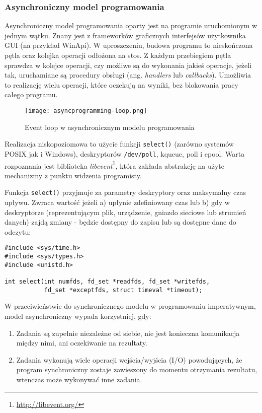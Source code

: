 \subsubsection{Asynchroniczny model programowania}
\label{subsub:asyncprogramming}

Asynchroniczny model programowania oparty jest na programie uruchomionym w jednym wątku. Znany jest z frameworków graficznych interfejsów użytkownika GUI (na przykład WinApi). W uproszczeniu, budowa programu to nieskończona pętla oraz kolejka operacji odłożona na stos. Z każdym przebiegiem pętla sprawdza w kolejce operacji, czy możliwe są do wykonania jakieś operacje, jeżeli tak, uruchamiane są procedury obsługi (ang. \emph{handlers} lub \emph{callbacks}). Umożliwia to realizację wielu operacji, które oczekują na wyniki, bez blokowania pracy całego programu.

\begin{figure}[H]
  \centering
    \texttt{[image: asyncprogramming-loop.png]}
  \caption[Event loop w asynchronicznym modelu programowania]{Event loop w asynchronicznym modelu programowania}
\end{figure}

Realizacja niskopoziomowa to użycie funkcji \lstinline{select()} (zarówno systemów POSIX jak i Windows), deskryptorów \lstinline{/dev/poll}, kqueue, poll i epool. Warta rozpoznania jest biblioteka \emph{libevent}\footnote{\url{http://libevent.org/}}, która zakłada abstrakcję na użyte mechanizmy z punktu widzenia programisty\cite{programming-async-sockets}.

Funkcja \lstinline{select()} przyjmuje za parametry deskryptory oraz maksymalny czas upływu. Zwraca wartość jeżeli a) upłynie zdefiniowany czas lub b) gdy w deskryptorze (reprezentującym plik, urządzenie, gniazdo sieciowe lub strumień danych) zajdą zmiany - będzie dostępny do zapisu lub są dostępne dane do odczytu:

\lstset{language=C}
\begin{lstlisting}
#include <sys/time.h>
#include <sys/types.h>
#include <unistd.h>

int select(int numfds, fd_set *readfds, fd_set *writefds,
           fd_set *exceptfds, struct timeval *timeout);
\end{lstlisting}

W przeciwieństwie do synchronicznego modelu w programowaniu imperatywnym, model asynchroniczny wypada korzystniej, gdy\cite{programming-async}:

\begin{enumerate}
  \item Zadania są zupełnie niezależne od siebie, nie jest konieczna komunikacja między nimi, ani oczekiwanie na rezultaty.
  \item Zadania wykonują wiele operacji wejścia/wyjścia (I/O) powodujących, że program synchroniczny zostaje zawieszony do momentu otrzymania rezultatu, wtenczas może wykonywać inne zadania.
\end{enumerate}

